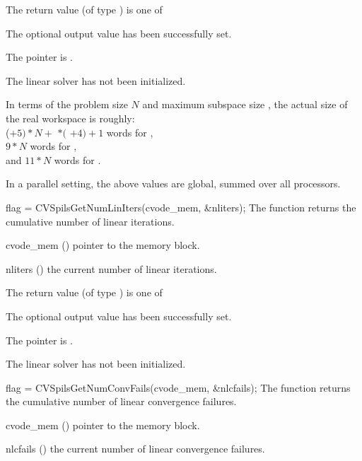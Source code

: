 {
  The return value  (of type ) is one of
  \begin{args}
  \item[\Id{CVSPILS\_SUCCESS}] 
    The optional output value has been successfully set.
  \item[\Id{CVSPILS\_MEM\_NULL}]
    The  pointer is .
  \item[\Id{CVSPILS\_LMEM\_NULL}]
    The {\cvspils} linear solver has not been initialized.
  \end{args}
}
{
  In terms of the problem size $N$ and maximum subspace size , 
  the actual size of the real workspace is roughly:\\
  ($+ 5)*N +$  $*($ $ + 4) + 1$ 
  words for {\cvspgmr},\\
  $9*N$  words for {\cvspbcg},\\
  and $11*N$  words for {\cvsptfqmr}.

  In a parallel setting, the above values are global, summed over all processors.
}
{
  flag = CVSpilsGetNumLinIters(cvode\_mem, \&nliters);
}
{
  The function  returns the
  cumulative number of linear iterations.
}
{
  \begin{args}
  \item[cvode\_mem] ()
    pointer to the {\cvode} memory block.
  \item[nliters] ()
    the current number of linear iterations.
  \end{args}
}
{
  The return value  (of type ) is one of
  \begin{args}
  \item[\Id{CVSPILS\_SUCCESS}] 
    The optional output value has been successfully set.
  \item[\Id{CVSPILS\_MEM\_NULL}]
    The  pointer is .
  \item[\Id{CVSPILS\_LMEM\_NULL}]
    The {\cvspils} linear solver has not been initialized.
  \end{args}
}
{}
{
  flag = CVSpilsGetNumConvFails(cvode\_mem, \&nlcfails);
}
{
  The function  returns the
  cumulative number of linear convergence failures.
}
{
  \begin{args}
  \item[cvode\_mem] ()
    pointer to the {\cvode} memory block.
  \item[nlcfails] ()
    the current number of linear convergence failures.
  \end{args}
}
